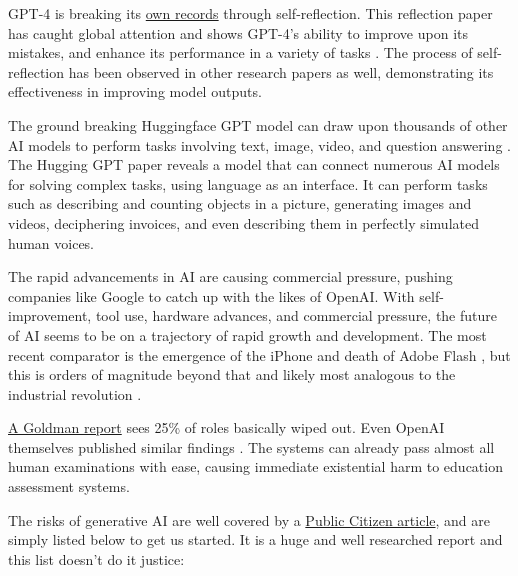 GPT-4 is breaking its \href{https://nanothoughts.substack.com/p/reflecting-on-reflexion}{own records} through self-reflection. This reflection paper has caught global attention and shows GPT-4's ability to improve upon its mistakes, and enhance its performance in a variety of tasks \cite{shinn2023reflexion}. The process of self-reflection has been observed in other research papers as well, demonstrating its effectiveness in improving model outputs.\par
The ground breaking Huggingface GPT model can draw upon thousands of other AI models to perform tasks involving text, image, video, and question answering \cite{shen2023hugginggpt}. The Hugging GPT paper reveals a model that can connect numerous AI models for solving complex tasks, using language as an interface. It can perform tasks such as describing and counting objects in a picture, generating images and videos, deciphering invoices, and even describing them in perfectly simulated human voices.\par
The rapid advancements in AI are causing commercial pressure, pushing companies like Google to catch up with the likes of OpenAI. With self-improvement, tool use, hardware advances, and commercial pressure, the future of AI seems to be on a trajectory of rapid growth and development. The most recent comparator is the emergence of the iPhone and death of Adobe Flash \cite{horton2019death}, but this is orders of magnitude beyond that and likely most analogous to the industrial revolution \cite{trajtenberg2018ai}. \par 
\href{https://www.key4biz.it/wp-content/uploads/2023/03/Global-Economics-Analyst_-The-Potentially-Large-Effects-of-Artificial-Intelligence-on-Economic-Growth-Briggs_Kodnani.pdf}{A Goldman report} sees 25\% of roles basically wiped out. Even OpenAI themselves published similar findings \cite{eloundou2023gpts}. The systems can already pass almost all human examinations with ease, causing immediate existential harm to education assessment systems.\par 
The risks of generative AI are well covered by a \href{https://www.citizen.org/article/sorry-in-advance-generative-ai-artificial-intellligence-chatgpt-report/}{Public Citizen article}, and are simply listed below to get us started. It is a huge and well researched report and this list doesn't do it justice:

